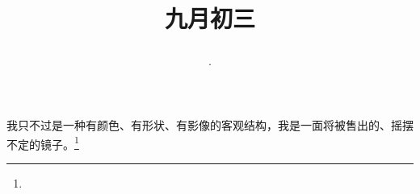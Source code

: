 \title{\date[d=5,m=10,y=2024][year:cn-y,年,month:cn,day:cn,日,·,weekday]·九月初三 }
我只不过是一种有颜色、有形状、有影像的客观结构，我是一面将被售出的、摇摆不定的镜子。\footnote{ }

